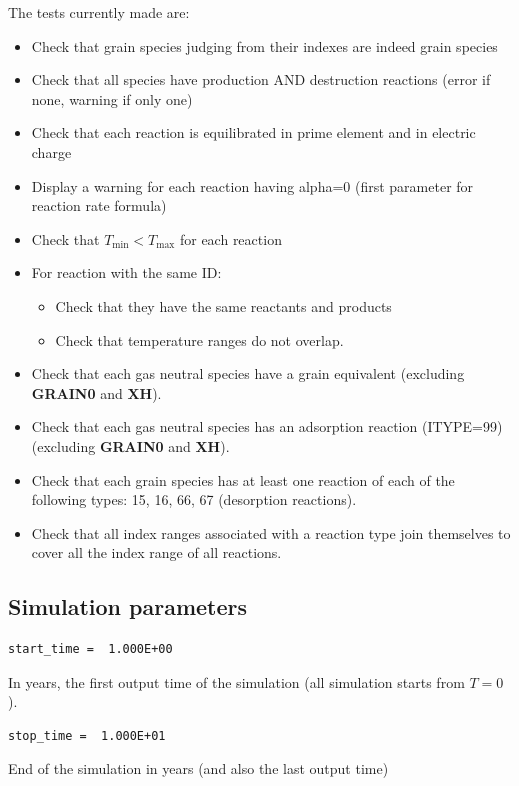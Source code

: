 \documentclass[english,a4paper,twoside]{article}
\begin{document}
The tests currently made are:
\begin{itemize}
\item Check that grain species judging from their indexes are indeed grain species
\item Check that all species have production AND destruction reactions (error if none, warning if only one)
\item Check that each reaction is equilibrated in prime element and in electric charge
\item Display a warning for each reaction having alpha=0 (first parameter for reaction rate formula)
\item Check that $T_\text{min} < T_\text{max}$ for each reaction
\item For reaction with the same ID:
\begin{itemize}
\item Check that they have the same reactants and products
\item Check that temperature ranges do not overlap.
\end{itemize}
\item Check that each gas neutral species have a grain equivalent (excluding \textbf{GRAIN0} and \textbf{XH}).
\item Check that each gas neutral species has an adsorption reaction (ITYPE=99) (excluding \textbf{GRAIN0} and \textbf{XH}).
\item Check that each grain species has at least one reaction of each of the following types: 15, 16, 66, 67 (desorption reactions).
\item Check that all index ranges associated with a reaction type join themselves to cover all the index range of all reactions.
\end{itemize}

\subsection{Simulation parameters}
\begin{verbatim}
start_time =  1.000E+00
\end{verbatim}
In years, the first output time of the simulation (all simulation starts from $T=0$).

\begin{verbatim}
stop_time =  1.000E+01
\end{verbatim}
End of the simulation in years (and also the last output time)
\end{document}
